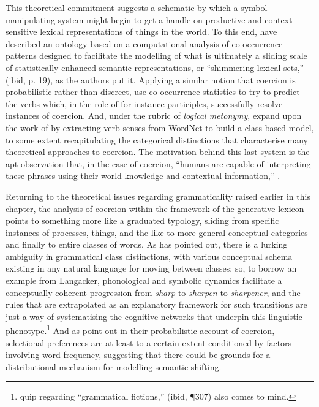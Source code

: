 This theoretical commitment suggests a schematic by which a symbol manipulating system might begin to get a handle on productive and context sensitive lexical representations of things in the world.  To this end, \cite{JezekEA2010} have described an ontology based on a computational analysis of co-occurrence patterns designed to facilitate the modelling of what is ultimately a sliding scale of statistically enhanced semantic representations, or ``shimmering lexical sets,'' (ibid, p. 19), as the authors put it.  Applying a similar notion that coercion is probabilistic rather than discreet, \cite{LapataEA2003} use co-occurrence statistics to try to predict the verbs which, in the role of for instance participles, successfully resolve instances of coercion.  And, under the rubric of \emph{logical metonymy}, \cite{ShutovaEA2013b} expand upon the work of \citeauthor{LapataEA2003} by extracting verb senses from WordNet to build a class based model, to some extent recapitulating the categorical distinctions that characterise many theoretical approaches to coercion.  The motivation behind this last system is the apt observation that, in the case of coercion, ``humans are capable of interpreting these phrases using their world knowledge and contextual information,'' \citep[][11:2]{ShutovaEA2013b}.

Returning to the theoretical issues regarding grammaticality raised earlier in this chapter, the analysis of coercion within the framework of the generative lexicon points to something more like a graduated typology, sliding from specific instances of processes, things, and the like to more general conceptual categories and finally to entire classes of words.  As \cite{Langacker1991} has pointed out, there is a lurking ambiguity in grammatical class distinctions, with various conceptual schema existing in any natural language for moving between classes: so, to borrow an example from Langacker, phonological and symbolic dynamics facilitate a conceptually coherent progression from \emph{sharp} to \emph{sharpen} to \emph{sharpener}, and the rules that are extrapolated as an explanatory framework for such transitions are just a way of systematising the cognitive networks that underpin this linguistic phenotype.\footnote{ quip regarding ``grammatical fictions,'' (ibid, \P 307) also comes to mind.}  And as \cite{BriscoeEA} point out in their probabilistic account of coercion, selectional preferences are at least to a certain extent conditioned by factors involving word frequency, suggesting that there could be grounds for a distributional mechanism for modelling semantic shifting.

